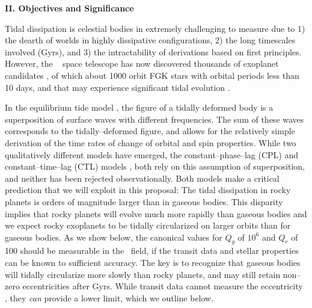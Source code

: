 \bigskip
\centerline{\bf II. Objectives and Significance}
\smallskip

\medskip
{\centerline{}}
\smallskip

Tidal dissipation is celestial bodies in extremely challenging to
measure
\citep{GoldreichSoter66,Hut81,AksnesFranklin01,Jackson08a,Jackson09,Makarov12}
due to 1) the dearth of worlds in highly dissipative configurations,
2) the long timescales involved (Gyrs), and 3) the intractability of
derivations based on first principles.  However, the \kepler~ space
telescope has now discovered thousands of exoplanet candidates
\citep{2013ApJS..204...24B}, of which about 1000 orbit FGK stars with
orbital periods less than 10 days, and that may experience significant
tidal evolution \cite{Rasio96,Jackson08a,Matsumura10}.

In the equilibrium tide model
\citep{Darwin1880,Jeffries56,MacDonald64,GoldreichSoter66,Hut81,FerrazMello08,Leconte10},
the figure of a tidally deformed body is a superposition of surface
waves with different frequencies.  The sum of these waves corresponds
to the tidally--deformed figure, and allows for the relatively simple
derivation of the time rates of change of orbital and spin properties.
While two qualitatively different models have emerged, the
constant--phase--lag (CPL) and constant--time--lag (CTL) models
\citep{Greenberg09}, both rely on this assumption of superposition,
and neither has been rejected observationally.  Both models make a
critical prediction that we will exploit in this proposal: The tidal
dissipation in rocky planets is orders of magnitude larger than in
gaseous bodies.  This disparity implies that rocky planets will evolve
much more rapidly than gaseous bodies and we expect rocky exoplanets
to be tidally circularized on larger orbits than for gaseous bodies.
As we show below, the canonical values for $Q_g$ of $10^6$ and $Q_r$
of 100 should be measurable in the \kepler~field, if the transit data
and stellar properties can be known to sufficient accuracy.  The key
is to recognize that gaseous bodies will tidally circularize more
slowly than rocky planets, and may still retain non--zero
eccentricities after Gyrs.  While transit data cannot measure the
eccentricity \citep{Barnes07}, they {\it can} provide a lower limit,
which we outline below.

\medskip
{\centerline{}}
\smallskip


